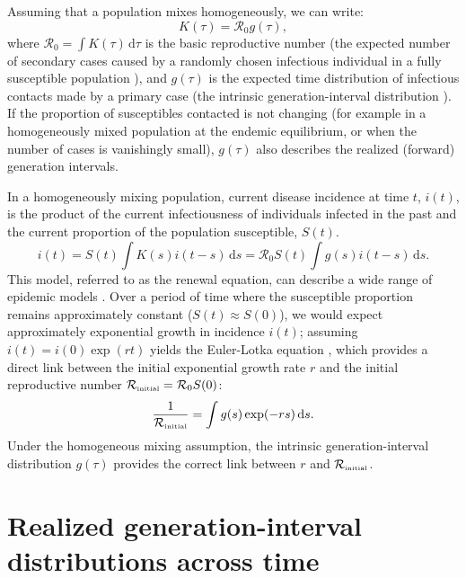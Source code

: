 \documentclass[12pt]{article}
\newcommand{\Rx}[1]{\ensuremath{{\mathcal R}_{#1}}\xspace}
\newcommand{\Ro}{\Rx{0}}
\newcommand{\RR}{\ensuremath{{\mathcal R}}}
\newcommand{\Rini}{\Rx{\textrm{\tiny initial}}}
\begin{document}
Assuming that a population mixes homogeneously, we can write: 
\begin{equation}
K(\tau) = \RR_0 g(\tau),
\end{equation}
where $\RR_0 = \int K(\tau)\,\mathrm{d}\tau$ is the basic reproductive number (the expected number of secondary cases caused by a randomly chosen infectious individual in a fully susceptible population \citep{anderson1991infectious}), 
and $g(\tau)$ is the expected time distribution of infectious contacts made by a primary case (the intrinsic generation-interval distribution \citep{champredon2015intrinsic}).
If the proportion of susceptibles contacted is not changing (for example in a homogeneously mixed population at the endemic equilibrium, or when the number of cases is vanishingly small), $g(\tau)$ also describes the realized (forward) generation intervals.

In a homogeneously mixing population, current disease incidence at time $t$, $i(t)$, is the product of the current infectiousness of individuals infected in the past and the current proportion of the population susceptible, $S(t)$.
\begin{equation}
i(t) = S(t) \int K(s) i(t-s)\,\mathrm{d}s = \RR_0 S(t) \int g(s) i(t-s)\,\mathrm{d}s.
\end{equation}
This model, referred to as the renewal equation, can describe a wide range of epidemic models \citep{heesterbeek1996concept, diekmann2000mathematical, roberts2004modelling, aldis2005integral, wallinga2007generation, roberts2007model, Champredon2018equivalence}.
Over a period of time where the susceptible proportion remains approximately constant ($S(t) \approx S(0)$), we would expect approximately exponential growth in incidence $i(t)$; assuming $i(t) = i(0) \exp(r t)$ yields the Euler-Lotka equation \citep{lotka1907relation}, which provides a direct link between the initial exponential growth rate $r$ and the initial reproductive number $\Rini = \Ro S(0)$:
\begin{equation}
\frac{1}{\Rini} = \int g(s) \exp(-r s)\,\mathrm{d}s.
\label{eq:euler}
\end{equation}
Under the homogeneous mixing assumption, the intrinsic generation-interval distribution $g(\tau)$ provides the correct link between $r$ and $\Rini$.

\section{Realized generation-interval distributions across time}
\end{document}
